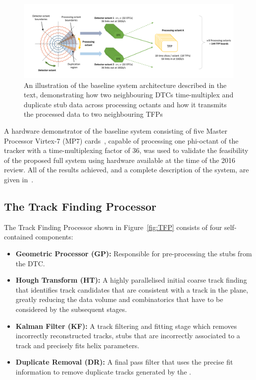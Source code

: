 \begin{figure}[h]
\centering
\includegraphics[width=1.00\textwidth]{figs/tk-upgrade/tmttarch.pdf}
\caption{An illustration of the baseline system architecture described in the text, demonstrating how two neighbouring DTCs time-multiplex and duplicate stub data across processing octants and how it transmits the processed data to two neighbouring TFPs~\cite{TMTT_JINST}}
\label{fig:tmttarch}
\end{figure}

A hardware demonstrator of the baseline system consisting of five Master Processor Virtex-7 (MP7) cards~\cite{mp7ref}, capable of processing one phi-octant of the tracker with a time-multiplexing factor of 36, was used to validate the feasibility of the proposed full system using hardware available at the time of the 2016 review.
All of the results achieved, and a complete description of the system, are given in~\cite{TMTT_JINST}.

\subsection{The Track Finding Processor}\label{subsec:TFP}
The Track Finding Processor shown in Figure~\ref{fig:TFP} consists of four self-contained components:
\begin{itemize}
\item {\bf Geometric Processor (GP):} Responsible for pre-processing the stubs from the DTC.
\item {\bf Hough Transform (HT):} A highly parallelised initial coarse track finding that identifies track candidates that are consistent with a track in the \rphi plane, greatly reducing the data volume and combinatorics that have to be considered by the subsequent stages.
\item {\bf Kalman Filter (KF):} A track filtering and fitting stage which removes incorrectly reconstructed tracks, stubs that are incorrectly associated to a track and precisely fits helix parameters.
\item {\bf Duplicate Removal (DR):} A final pass filter that uses the precise fit information to remove duplicate tracks generated by the \HT.
\end{itemize}

